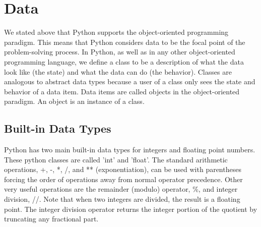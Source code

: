 \chapter{Data}


We stated above that Python supports the object-oriented programming paradigm. This means that Python considers data to be the focal point of the problem-solving process. In Python, as well as in any other object-oriented programming language, we define a class to be a description of what the data look like (the state) and what the data can do (the behavior). Classes are analogous to abstract data types because a user of a class only sees the state and behavior of a data item. Data items are called objects in the object-oriented paradigm. An object is an instance of a class.


\section{Built-in Data Types}
Python has two main built-in data types for integers and floating point numbers. These python classes are called 'int' and 'float'. The standard arithmetic operations, +, -, *, /, and ** (exponentiation), can be used with parentheses forcing the order of operations away from normal operator precedence. Other very useful operations are the remainder (modulo) operator, \%, and integer division, //. Note that when two integers are divided, the result is a floating point. The integer division operator returns the integer portion of the quotient by truncating any fractional part.
